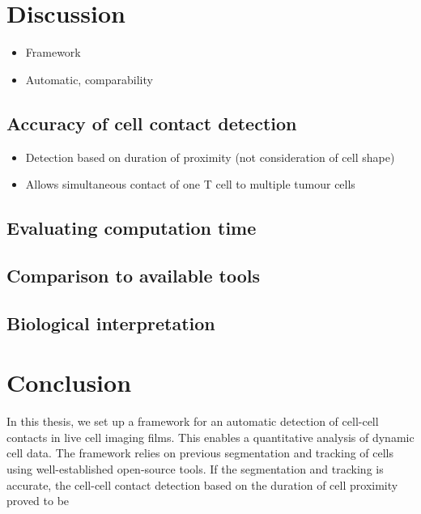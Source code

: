 \documentclass{report}
\begin{document}
\allsectionsfont{\sffamily}
\onehalfspacing

\setlength\parindent{0pt}

\chapter{Discussion}

\begin{itemize}
	\item Framework
	\item Automatic, comparability
\end{itemize}

\section{Accuracy of cell contact detection}

\begin{itemize}
	\item Detection based on duration of proximity (not consideration of cell shape)
	\item Allows simultaneous contact of one T cell to multiple tumour cells
\end{itemize}

\section{Evaluating computation time}


\section{Comparison to available tools}


\section{Biological interpretation}


\chapter{Conclusion}

In this thesis, we set up a framework for an automatic detection of cell-cell contacts in live cell imaging films. This enables a quantitative analysis of dynamic cell data.
The framework relies on previous segmentation and tracking of cells using well-established open-source tools. If the segmentation and tracking is accurate, the cell-cell contact detection based on the duration of cell proximity proved to be


\renewcommand{\bibname}{References}

\end{document}
